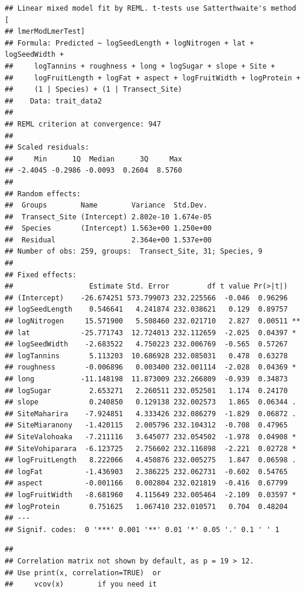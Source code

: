\documentclass[
  12pt,
]{article}
\begin{document}
\begin{verbatim}
## Linear mixed model fit by REML. t-tests use Satterthwaite's method [
## lmerModLmerTest]
## Formula: Predicted ~ logSeedLength + logNitrogen + lat + logSeedWidth +  
##     logTannins + roughness + long + logSugar + slope + Site +  
##     logFruitLength + logFat + aspect + logFruitWidth + logProtein +  
##     (1 | Species) + (1 | Transect_Site)
##    Data: trait_data2
## 
## REML criterion at convergence: 947
## 
## Scaled residuals: 
##     Min      1Q  Median      3Q     Max 
## -2.4045 -0.2986 -0.0093  0.2604  8.5760 
## 
## Random effects:
##  Groups        Name        Variance  Std.Dev. 
##  Transect_Site (Intercept) 2.802e-10 1.674e-05
##  Species       (Intercept) 1.563e+00 1.250e+00
##  Residual                  2.364e+00 1.537e+00
## Number of obs: 259, groups:  Transect_Site, 31; Species, 9
## 
## Fixed effects:
##                  Estimate Std. Error         df t value Pr(>|t|)   
## (Intercept)    -26.674251 573.799073 232.225566  -0.046  0.96296   
## logSeedLength    0.546641   4.241874 232.038621   0.129  0.89757   
## logNitrogen     15.571900   5.508460 232.021710   2.827  0.00511 **
## lat            -25.771743  12.724013 232.112659  -2.025  0.04397 * 
## logSeedWidth    -2.683522   4.750223 232.006769  -0.565  0.57267   
## logTannins       5.113203  10.686928 232.085031   0.478  0.63278   
## roughness       -0.006896   0.003400 232.001114  -2.028  0.04369 * 
## long           -11.148198  11.873009 232.266809  -0.939  0.34873   
## logSugar         2.653271   2.260511 232.052501   1.174  0.24170   
## slope            0.240850   0.129138 232.002573   1.865  0.06344 . 
## SiteMaharira    -7.924851   4.333426 232.086279  -1.829  0.06872 . 
## SiteMiaranony   -1.420115   2.005796 232.104312  -0.708  0.47965   
## SiteValohoaka   -7.211116   3.645077 232.054502  -1.978  0.04908 * 
## SiteVohiparara  -6.123725   2.756602 232.116898  -2.221  0.02728 * 
## logFruitLength   8.222066   4.450876 232.005275   1.847  0.06598 . 
## logFat          -1.436903   2.386225 232.062731  -0.602  0.54765   
## aspect          -0.001166   0.002804 232.021819  -0.416  0.67799   
## logFruitWidth   -8.681960   4.115649 232.005464  -2.109  0.03597 * 
## logProtein       0.751625   1.067410 232.010571   0.704  0.48204   
## ---
## Signif. codes:  0 '***' 0.001 '**' 0.01 '*' 0.05 '.' 0.1 ' ' 1
\end{verbatim}

\begin{verbatim}
## 
## Correlation matrix not shown by default, as p = 19 > 12.
## Use print(x, correlation=TRUE)  or
##     vcov(x)        if you need it
\end{verbatim}
\end{document}
